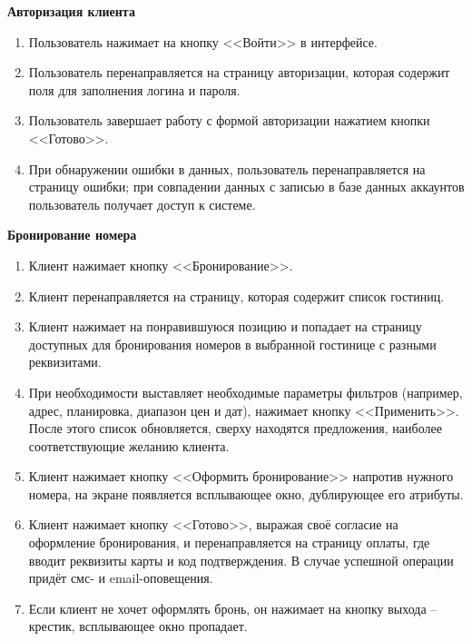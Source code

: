 \textbf{Авторизация клиента}
\begin{enumerate}
	\item Пользователь нажимает на кнопку <<Войти>> в интерфейсе.
	
	\item Пользователь перенаправляется на страницу авторизации, которая содержит поля для заполнения логина и пароля.
	
	\item Пользователь завершает работу с формой авторизации нажатием кнопки <<Готово>>.
	
	\item При обнаружении ошибки в данных, пользователь перенаправляется на страницу ошибки; при совпадении данных с записью в базе данных аккаунтов пользователь получает доступ к системе. \\
\end{enumerate}

\textbf{Бронирование номера}
\begin{enumerate}
	\item Клиент нажимает кнопку <<Бронирование>>.
	
	\item Клиент перенаправляется на страницу, которая содержит список гостиниц.
	
	\item Клиент нажимает на понравившуюся позицию и попадает на страницу доступных для бронирования номеров в выбранной гостинице с разными реквизитами.
	
	\item При необходимости выставляет необходимые параметры фильтров (например, адрес, планировка, диапазон цен и дат), нажимает кнопку <<Применить>>. После этого список обновляется, сверху находятся предложения, наиболее соответствующие желанию клиента.
	
	\item Клиент нажимает кнопку <<Оформить бронирование>> напротив нужного номера, на экране появляется всплывающее окно, дублирующее его атрибуты.
	
	\item Клиент нажимает кнопку <<Готово>>, выражая своё согласие на оформление бронирования, и перенаправляется на страницу оплаты, где вводит реквизиты карты и код подтверждения. В случае успешной операции придёт смс- и email-оповещения.
	
	\item Если клиент не хочет оформлять бронь, он нажимает на кнопку выхода -- крестик, всплывающее окно пропадает. \\
\end{enumerate}

